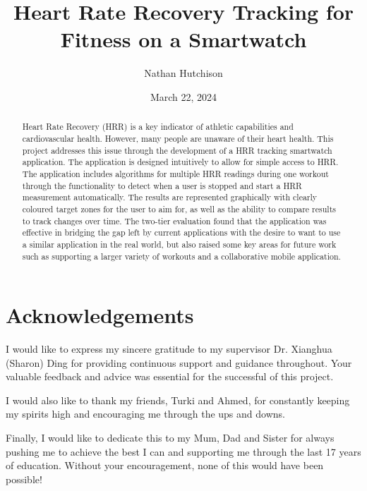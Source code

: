 \documentclass{l4proj}
\begin{document}
\title{Heart Rate Recovery Tracking for Fitness on a Smartwatch}
\author{Nathan Hutchison}
\date{March 22, 2024}

\maketitle

\begin{abstract}
    Heart Rate Recovery (HRR) is a key indicator of athletic capabilities and cardiovascular health. However, many people are unaware of their heart health. This project addresses this issue through the development of a HRR tracking smartwatch application. The application is designed intuitively to allow for simple access to HRR. The application includes algorithms for multiple HRR readings during one workout through the functionality to detect when a user is stopped and start a HRR measurement automatically. The results are represented graphically with clearly coloured target zones for the user to aim for, as well as the ability to compare results to track changes over time. The two-tier evaluation found that the application was effective in bridging the gap left by current applications with the desire to want to use a similar application in the real world, but also raised some key areas for future work such as supporting a larger variety of workouts and a collaborative mobile application.
\end{abstract}



\chapter*{Acknowledgements}

I would like to express my sincere gratitude to my supervisor Dr. Xianghua (Sharon) Ding for providing continuous support and guidance throughout. Your valuable feedback and advice was essential for the successful of this project.

I would also like to thank my friends, Turki and Ahmed, for constantly keeping my spirits high and encouraging me through the ups and downs.

Finally, I would like to dedicate this to my Mum, Dad and Sister for always pushing me to achieve the best I can and supporting me through the last 17 years of education. Without your encouragement, none of this would have been possible!
\end{document}
